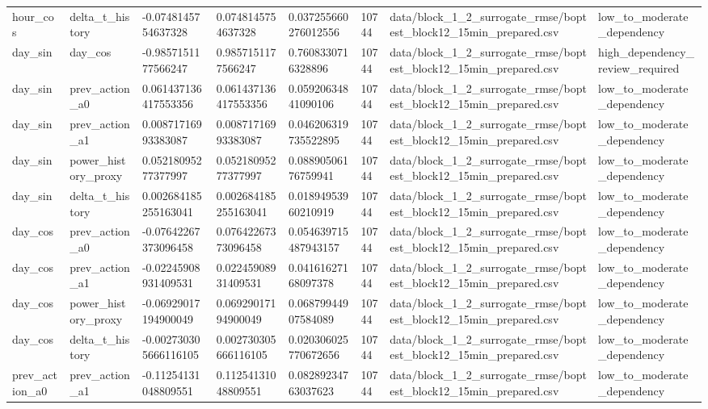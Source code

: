 \documentclass[11pt,a4paper]{article}
\begin{document}
\begin{small}
\begin{longtable}{L{2.06cm} L{2.06cm} L{2.06cm} L{2.06cm} L{2.06cm} L{2.06cm} L{2.06cm} L{2.06cm}}
hour\_cos & delta\_t\_history & -0.0748145754637328 & 0.0748145754637328 & 0.037255660276012556 & 10744 & data/block\_1\_2\_surrogate\_rmse/boptest\_block12\_15min\_prepared.csv & low\_to\_moderate\_dependency \\
day\_sin & day\_cos & -0.9857151177566247 & 0.9857151177566247 & 0.7608330716328896 & 10744 & data/block\_1\_2\_surrogate\_rmse/boptest\_block12\_15min\_prepared.csv & high\_dependency\_review\_required \\
day\_sin & prev\_action\_a0 & 0.061437136417553356 & 0.061437136417553356 & 0.05920634841090106 & 10744 & data/block\_1\_2\_surrogate\_rmse/boptest\_block12\_15min\_prepared.csv & low\_to\_moderate\_dependency \\
day\_sin & prev\_action\_a1 & 0.00871716993383087 & 0.00871716993383087 & 0.046206319735522895 & 10744 & data/block\_1\_2\_surrogate\_rmse/boptest\_block12\_15min\_prepared.csv & low\_to\_moderate\_dependency \\
day\_sin & power\_history\_proxy & 0.05218095277377997 & 0.05218095277377997 & 0.08890506176759941 & 10744 & data/block\_1\_2\_surrogate\_rmse/boptest\_block12\_15min\_prepared.csv & low\_to\_moderate\_dependency \\
day\_sin & delta\_t\_history & 0.002684185255163041 & 0.002684185255163041 & 0.01894953960210919 & 10744 & data/block\_1\_2\_surrogate\_rmse/boptest\_block12\_15min\_prepared.csv & low\_to\_moderate\_dependency \\
day\_cos & prev\_action\_a0 & -0.07642267373096458 & 0.07642267373096458 & 0.054639715487943157 & 10744 & data/block\_1\_2\_surrogate\_rmse/boptest\_block12\_15min\_prepared.csv & low\_to\_moderate\_dependency \\
day\_cos & prev\_action\_a1 & -0.02245908931409531 & 0.02245908931409531 & 0.04161627168097378 & 10744 & data/block\_1\_2\_surrogate\_rmse/boptest\_block12\_15min\_prepared.csv & low\_to\_moderate\_dependency \\
day\_cos & power\_history\_proxy & -0.06929017194900049 & 0.06929017194900049 & 0.06879944907584089 & 10744 & data/block\_1\_2\_surrogate\_rmse/boptest\_block12\_15min\_prepared.csv & low\_to\_moderate\_dependency \\
day\_cos & delta\_t\_history & -0.002730305666116105 & 0.002730305666116105 & 0.020306025770672656 & 10744 & data/block\_1\_2\_surrogate\_rmse/boptest\_block12\_15min\_prepared.csv & low\_to\_moderate\_dependency \\
prev\_action\_a0 & prev\_action\_a1 & -0.11254131048809551 & 0.11254131048809551 & 0.08289234763037623 & 10744 & data/block\_1\_2\_surrogate\_rmse/boptest\_block12\_15min\_prepared.csv & low\_to\_moderate\_dependency \\

\end{longtable}
\end{small}
\end{document}
